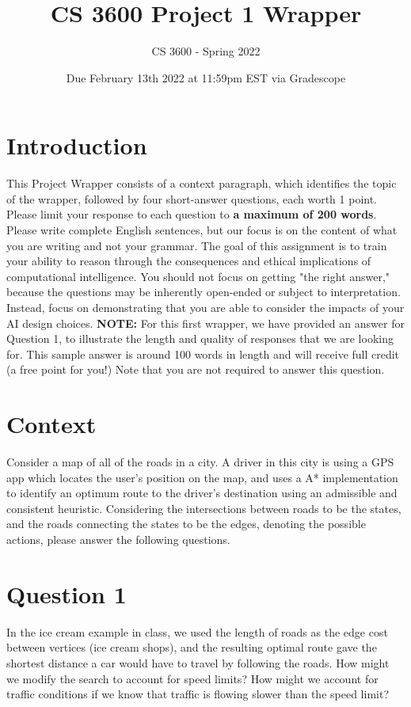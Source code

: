 \documentclass[12pt]{extarticle}
\title{CS 3600 Project 1 Wrapper}
\author{CS 3600 - Spring 2022}
\date{Due February 13th 2022 at 11:59pm EST via Gradescope}
\begin{document}
\maketitle

\section*{Introduction}

This Project Wrapper consists of a context paragraph, which identifies the topic of the wrapper, followed by four short-answer questions, each worth 1 point. Please limit your response to each question to \textbf{a maximum of 200 words}. Please write complete English sentences, but our focus is on the content of what you are writing and not your grammar. The goal of this assignment is to train your ability to reason through the consequences and ethical implications of computational intelligence. You should not focus on getting "the right answer," because the questions may be inherently open-ended or subject to interpretation.  Instead, focus on demonstrating that you are able to consider the impacts of your AI design choices.  \textbf{NOTE:} For this first wrapper, we have provided an answer for Question 1, to illustrate the length and quality of responses that we are looking for. This sample answer is around 100 words in length and will receive full credit (a free point for you!) Note that you are not required to answer this question.

\section*{Context}

Consider a map of all of the roads in a city.  A driver in this city is using a GPS app which locates the user’s position on the map, and uses a A* implementation to identify an optimum route to the driver’s destination using an admissible and consistent heuristic.  Considering the intersections between roads to be the states, and the  roads  connecting the states to be the edges, denoting the possible actions, please answer  the  following questions.

\newpage
\section*{Question 1}

In the ice cream example in class, we used the length of roads as the edge cost between vertices (ice cream shops), and the resulting optimal route gave the shortest distance a car would have to travel by following the roads. How might we modify the search to account for speed limits?  How might we account for traffic conditions if we know that traffic is flowing slower than the speed limit? \\
\end{document}
